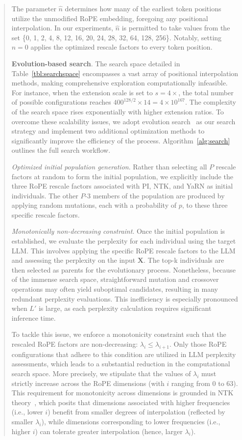 \begin{abstract}
The parameter $\hat{n}$ determines how many of the earliest token positions utilize the unmodified RoPE embedding, foregoing any positional interpolation. In our experiments, $\hat{n}$ is permitted to take values from the set \{0, 1, 2, 4, 8, 12, 16, 20, 24, 28, 32, 64, 128, 256\}. Notably, setting $\hat{n}=0$ applies the optimized rescale factors to every token position.

\textbf{Evolution-based search}. The search space detailed in Table~\ref{tbl:searchspace} encompasses a vast array of positional interpolation methods, making comprehensive exploration computationally infeasible. For instance, when the extension scale is set to $s=4\times$, the total number of possible configurations reaches $400^{128/2}\times14=4\times10^{167}$. The complexity of the search space rises exponentially with higher extension ratios. To overcome these scalability issues, we adopt evolution search~\cite{guo2020single} as our search strategy and implement two additional optimization methods to significantly improve the efficiency of the process. Algorithm~\ref{alg:search} outlines the full search workflow.

\textit{Optimized initial population generation}. Rather than selecting all $P$ rescale factors at random to form the initial population, we explicitly include the three RoPE rescale factors associated with PI, NTK, and YaRN as initial individuals. The other $P$-3 members of the population are produced by applying random mutations, each with a probability of $p$, to these three specific rescale factors.

\textit{Monotonically non-decreasing constraint}. Once the initial population is established, we evaluate the perplexity for each individual using the target LLM. This involves applying the specific RoPE rescale factors to the LLM and assessing the perplexity on the input $\mathbf{X}$. The top-k individuals are then selected as parents for the evolutionary process. Nonetheless, because of the immense search space, straightforward mutation and crossover operations may often yield suboptimal candidates, resulting in many redundant perplexity evaluations. This inefficiency is especially pronounced when $L'$ is large, as each perplexity calculation requires significant inference time.

To tackle this issue, we enforce a monotonicity constraint such that the rescaled RoPE factors are non-decreasing: $\lambda_i \le \lambda_{i+1}$. Only those RoPE configurations that adhere to this condition are utilized in LLM perplexity assessments, which leads to a substantial reduction in the computational search space. More precisely, we stipulate that the values of $\lambda_i$ must strictly increase across the RoPE dimensions (with $i$ ranging from 0 to 63). This requirement for monotonicity across dimensions is grounded in NTK theory~\cite{jacot2018neural,tancik2020fourier,ntk}, which posits that dimensions associated with higher frequencies (i.e., lower $i$) benefit from smaller degrees of interpolation (reflected by smaller $\lambda_i$), while dimensions corresponding to lower frequencies (i.e., higher $i$) can tolerate greater interpolation (hence, larger $\lambda_i$).


\end{abstract}
